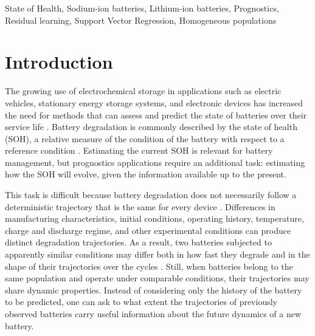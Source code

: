 \documentclass[conference]{IEEEtran}
\begin{document}
\begin{IEEEkeywords}
State of Health, Sodium-ion batteries, Lithium-ion batteries, Prognostics, Residual learning, Support Vector Regression, Homogeneous populations
\end{IEEEkeywords}


\section{Introduction}
\label{cap:introducao}

The growing use of electrochemical storage in applications such as electric vehicles, stationary energy storage systems, and electronic devices has increased the need for methods that can assess and predict the state of batteries over their service life \cite{ngoy2025lithium, 2011electrical}. Battery degradation is commonly described by the state of health (SOH), a relative measure of the condition of the battery with respect to a reference condition \cite{WANG2026239106}. Estimating the current SOH is relevant for battery management, but prognostics applications require an additional task: estimating how the SOH will evolve, given the information available up to the present.

This task is difficult because battery degradation does not necessarily follow a deterministic trajectory that is the same for every device \cite{zhu2025bayesian}. Differences in manufacturing characteristics, initial conditions, operating history, temperature, charge and discharge regime, and other experimental conditions can produce distinct degradation trajectories. As a result, two batteries subjected to apparently similar conditions may differ both in how fast they degrade and in the shape of their trajectories over the cycles \cite{baumhofer2014production}. Still, when batteries belong to the same population and operate under comparable conditions, their trajectories may share dynamic properties. Instead of considering only the history of the battery to be predicted, one can ask to what extent the trajectories of previously observed batteries carry useful information about the future dynamics of a new battery.
\end{document}
